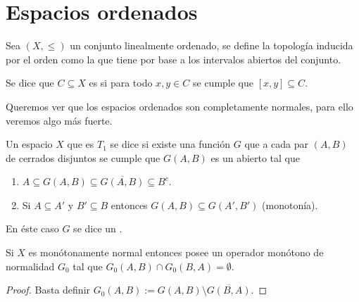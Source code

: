 \documentclass[topologia-analisis.tex]{subfiles}
\begin{document}
\section{Espacios ordenados}
\begin{mydefi}
	Sea $(X, \le)$ un conjunto linealmente ordenado, se define la topología inducida por el orden como la que tiene por base
	a los intervalos abiertos del conjunto.
	\par
	Se dice que $C \subseteq X$ es  si para todo $x, y\in C$ se cumple que $[x, y] \subseteq C$.
\end{mydefi}
Queremos ver que los espacios ordenados son completamente normales, para ello veremos algo más fuerte.

\begin{mydef}
	Un espacio $X$ que es $T_1$ se dice  si existe una función $G$ que a cada par
	$(A, B)$ de cerrados disjuntos se cumple que $G(A, B)$ es un abierto tal que
	\begin{enumerate}
		\item $A \subseteq G(A, B) \subseteq \overline{G(A, B)} \subseteq B^c$.
		\item Si $A \subseteq A'$ y $B' \subseteq B$ entonces $G(A, B) \subseteq G(A', B')$ (monotonía).
	\end{enumerate}
	En éste caso $G$ se dice un .
\end{mydef}

\begin{prop}
	Si $X$ es monótonamente normal entonces posee un operador monótono de normalidad $G_0$ tal que
	$G_0(A, B) \cap G_0(B, A) = \emptyset$.
\end{prop}
\begin{proof}
	Basta definir $G_0(A, B) := G(A, B) \setminus \overline{G(B, A)}$.
\end{proof}
\end{document}

